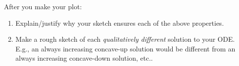 \begin{enumerate}
    After you make your plot:
    \begin{enumerate}
        \item Explain/justify why your sketch ensures each of the above properties.
        \item Make a rough sketch of each \emph{qualitatively different} 
        solution to your ODE. E.g., an always increasing concave-up solution would be different from an always increasing concave-down solution, etc..
    \end{enumerate}
\end{enumerate}
